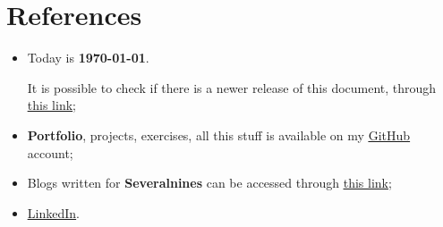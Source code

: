 \section{References}

\begin{itemize}

  \item Today is \textbf{\today}.

    It is possible to check if there is a newer release of this
    document, through
    \underline{\href{https://github.com/aslthiago/cv/releases/}{this link}};

  \item \textbf{Portfolio}, projects, exercises, all this stuff is available on my
    \underline{\href{https://github.com/aslthiago/}{GitHub}} account;

  \item Blogs written for \textbf{Severalnines} can be accessed through
    \underline{\href{https://severalnines.com/database-blog/author/25319}{this link}};

  \item \underline{\href{https://www.linkedin.com/in/aslthiago/}{LinkedIn}}.
\end{itemize}
